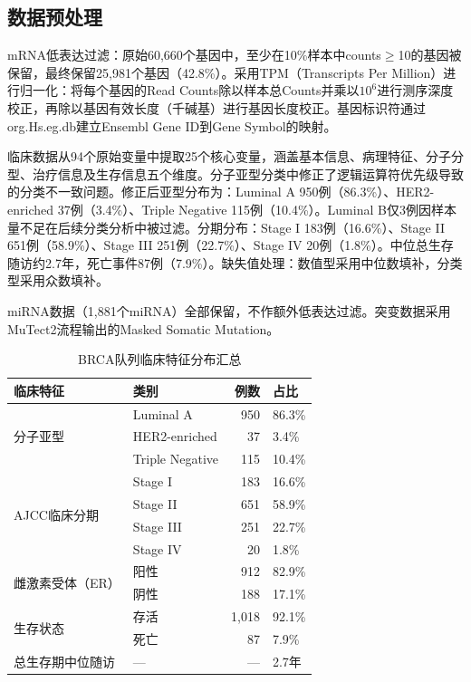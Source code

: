 \documentclass[12pt,a4paper]{ctexart}
\begin{document}
\subsection{数据预处理}

mRNA低表达过滤：原始60,660个基因中，至少在10\%样本中counts$\geq$10的基因被保留，最终保留25,981个基因（42.8\%）。采用TPM（Transcripts Per Million）进行归一化：将每个基因的Read Counts除以样本总Counts并乘以$10^6$进行测序深度校正，再除以基因有效长度（千碱基）进行基因长度校正。基因标识符通过org.Hs.eg.db建立Ensembl Gene ID到Gene Symbol的映射。

临床数据从94个原始变量中提取25个核心变量，涵盖基本信息、病理特征、分子分型、治疗信息及生存信息五个维度。分子亚型分类中修正了逻辑运算符优先级导致的分类不一致问题。修正后亚型分布为：Luminal A 950例（86.3\%）、HER2-enriched 37例（3.4\%）、Triple Negative 115例（10.4\%）。Luminal B仅3例因样本量不足在后续分类分析中被过滤。分期分布：Stage I 183例（16.6\%）、Stage II 651例（58.9\%）、Stage III 251例（22.7\%）、Stage IV 20例（1.8\%）。中位总生存随访约2.7年，死亡事件87例（7.9\%）。缺失值处理：数值型采用中位数填补，分类型采用众数填补。

miRNA数据（1,881个miRNA）全部保留，不作额外低表达过滤。突变数据采用MuTect2流程输出的Masked Somatic Mutation。

\begin{table}[htbp]
\centering
\caption{BRCA队列临床特征分布汇总}
\label{tab:clinical}
\begin{tabular}{llrl}
\toprule
临床特征 & 类别 & 例数 & 占比 \\
\midrule
\multirow{3}{*}{分子亚型} & Luminal A & 950 & 86.3\% \\
& HER2-enriched & 37 & 3.4\% \\
& Triple Negative & 115 & 10.4\% \\
\midrule
\multirow{4}{*}{AJCC临床分期} & Stage I & 183 & 16.6\% \\
& Stage II & 651 & 58.9\% \\
& Stage III & 251 & 22.7\% \\
& Stage IV & 20 & 1.8\% \\
\midrule
\multirow{2}{*}{雌激素受体（ER）} & 阳性 & 912 & 82.9\% \\
& 阴性 & 188 & 17.1\% \\
\midrule
\multirow{2}{*}{生存状态} & 存活 & 1,018 & 92.1\% \\
& 死亡 & 87 & 7.9\% \\
\midrule
总生存期中位随访 & — & — & 2.7年 \\
\bottomrule
\end{tabular}
\end{table}
\end{document}
